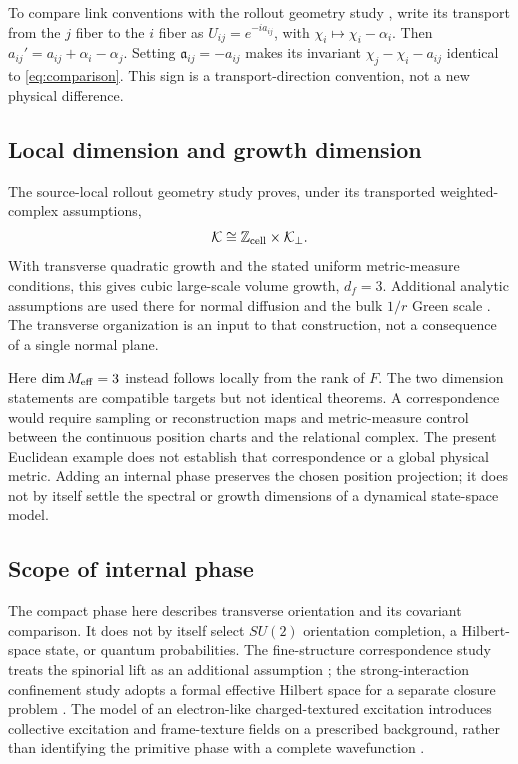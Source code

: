 \documentclass[11pt]{article}
\newcommand{\Z}{\mathbb Z}
\begin{document}
To compare link conventions with the rollout geometry study \cite{WuGeometry}, write its transport from the $j$ fiber to the $i$ fiber as $U_{ij}=e^{-ia_{ij}}$, with $\chi_i\mapsto\chi_i-\alpha_i$. Then $a_{ij}'=a_{ij}+\alpha_i-\alpha_j$. Setting $\mathfrak a_{ij}=-a_{ij}$ makes its invariant $\chi_j-\chi_i-a_{ij}$ identical to \eqref{eq:comparison}. This sign is a transport-direction convention, not a new physical difference.

\subsection{Local dimension and growth dimension}

The source-local rollout geometry study \cite{WuGeometry} proves, under its transported weighted-complex assumptions,
\begin{equation}
 \mathcal K\cong\Z_{\rm cell}\times\mathcal K_\perp.
\end{equation}
With transverse quadratic growth and the stated uniform metric-measure conditions, this gives cubic large-scale volume growth, $d_f=3$. Additional analytic assumptions are used there for normal diffusion and the bulk $1/r$ Green scale \cite{WuGeometry}. The transverse organization is an input to that construction, not a consequence of a single normal plane.

Here $\dim M_{\rm eff}=3$ instead follows locally from the rank of $F$. The two dimension statements are compatible targets but not identical theorems. A correspondence would require sampling or reconstruction maps and metric-measure control between the continuous position charts and the relational complex. The present Euclidean example does not establish that correspondence or a global physical metric. Adding an internal phase preserves the chosen position projection; it does not by itself settle the spectral or growth dimensions of a dynamical state-space model.

\subsection{Scope of internal phase}

The compact phase here describes transverse orientation and its covariant comparison. It does not by itself select $SU(2)$ orientation completion, a Hilbert-space state, or quantum probabilities. The fine-structure correspondence study treats the spinorial lift as an additional assumption \cite{WuAlpha}; the strong-interaction confinement study adopts a formal effective Hilbert space for a separate closure problem \cite{WuStrong}. The model of an electron-like charged-textured excitation introduces collective excitation and frame-texture fields on a prescribed background, rather than identifying the primitive phase with a complete wavefunction \cite{WuElectron}.
\end{document}
